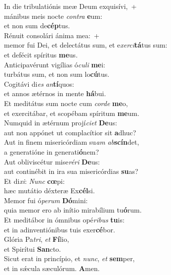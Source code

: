 \evenverse In die tribulatiónis meæ Deum exquisívi,~+\\\evenverse  mánibus meis nocte \textit{con}\textit{tra} \textbf{e}um:~\*\\
\evenverse et non sum de\textbf{cép}tus.\\
\oddverse Rénuit consolári ánima mea:~+\\
\oddverse  memor fui Dei, et delectátus sum, et e\textit{xer}\textit{ci}\textbf{tá}tus sum:~\*\\
\oddverse et defécit spíritus \textbf{me}us.\\
\evenverse Anticipavérunt vigílias ó\textit{cu}\textit{li} \textbf{me}i:~\*\\
\evenverse turbátus sum, et non sum lo\textbf{cú}tus.\\
\oddverse Cogitávi di\textit{es} \textit{an}\textbf{tí}quos:~\*\\
\oddverse et annos ætérnos in mente \textbf{há}bui.\\
\evenverse Et meditátus sum nocte cum \textit{cor}\textit{de} \textbf{me}o,~\*\\
\evenverse et exercitábar, et scopébam spíritum \textbf{me}um.\\
\oddverse Numquid in ætérnum projí\textit{ci}\textit{et} \textbf{De}us:~\*\\
\oddverse aut non appónet ut complacítior sit \textbf{a}dhuc?\\
\evenverse Aut in finem misericórdiam su\textit{am} \textit{ab}\textbf{scín}det,~\*\\
\evenverse a generatióne in generati\textbf{ó}nem?\\
\oddverse Aut obliviscétur mise\textit{ré}\textit{ri} \textbf{De}us:~\*\\
\oddverse aut continébit in ira sua misericórdias \textbf{su}as?\\
\evenverse Et di\textit{xi}: \textit{Nunc} \textbf{cœ}pi:~\*\\
\evenverse hæc mutátio déxteræ Ex\textbf{cél}si.\\
\oddverse Memor fui ó\textit{pe}\textit{rum} \textbf{Dó}mini:~\*\\
\oddverse quia memor ero ab inítio mirabílium tu\textbf{ó}rum.\\
\evenverse Et meditábor in ómnibus opé\textit{ri}\textit{bus} \textbf{tu}is:~\*\\
\evenverse et in adinventiónibus tuis exer\textbf{cé}bor.\\
\oddverse Glória Pa\textit{tri}, \textit{et} \textbf{Fí}lio,~\*\\
\oddverse et Spirítui \textbf{San}cto.\\
\evenverse Sicut erat in princípio, et \textit{nunc}, \textit{et} \textbf{sem}per,~\*\\
\evenverse et in sǽcula sæculórum. \textbf{A}men.\\
